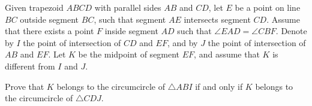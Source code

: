 Given trapezoid $ABCD$ with parallel sides $AB$ and $CD$,  let $E$ be a point on line $BC$ outside segment $BC$,  such that segment $AE$ intersects segment $CD$. Assume that there exists a point $F$ inside segment $AD$ such that $\angle EAD=\angle CBF$. Denote by $I$ the point of intersection of $CD$ and $EF$,  and by $J$ the point of intersection of $AB$ and $EF$. Let $K$ be the midpoint of segment $EF$,  and assume that $K$ is different from $I$ and $J$.

Prove that $K$ belongs to the circumcircle of $\triangle ABI$ if and only if $K$ belongs to the circumcircle of $\triangle CDJ$.
